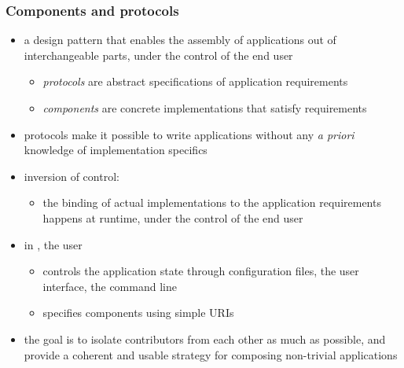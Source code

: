 \begin{frame}
%
  \frametitle{Components and protocols}
%
  \begin{itemize}
%
  \item a design pattern\supercite{patterns} that enables the assembly of applications out of
    interchangeable parts, under the control of the end user
      \begin{itemize}
      \item \emph{protocols} are abstract specifications of application requirements
      \item \emph{components} are concrete implementations that satisfy requirements
      \end{itemize}
%
    \item protocols make it possible to write applications without any \emph{a priori} knowledge
      of implementation specifics
%
    \item inversion of control\supercite{johnson-88}:
      \begin{itemize}
      \item the binding of actual implementations to the application requirements happens at
        runtime, under the control of the end user
      \end{itemize}
%
    \item in \pyre, the user
      \begin{itemize}
      \item controls the application state through configuration files, the user interface, the
        command line
      \item specifies components using simple URIs
      \end{itemize}
%
    \item the goal is to isolate contributors from each other as much as possible, and provide
      a coherent and usable strategy for composing non-trivial applications
%
  \end{itemize}
%
\end{frame}


